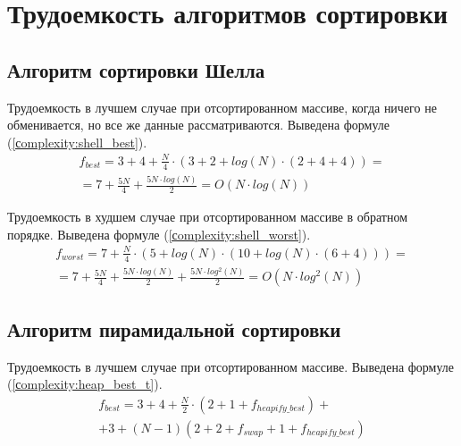 \section{Трудоемкость алгоритмов сортировки}

\subsection{Алгоритм сортировки Шелла}

Трудоемкость в лучшем случае при отсортированном массиве, когда ничего не обменивается, но все же данные рассматриваются. Выведена \newline формуле (\ref{сomplexity:shell_best}).
\begin{equation}
	\label{сomplexity:shell_best}
	\begin{gathered}
		f_{best} = 3 + 4 + \frac{N}{4} \cdot (3 + 2 + log(N) \cdot (2 + 4 + 4)) = \\
		= 7 + \frac{5N}{4} + \frac{5N \cdot log(N)}{2} = O(N \cdot log(N))
	\end{gathered}
\end{equation}

Трудоемкость в худшем случае при отсортированном массиве в обратном порядке. Выведена формуле (\ref{сomplexity:shell_worst}).
\begin{equation}
	\label{сomplexity:shell_worst}
	\begin{gathered}
		f_{worst} = 7 + \frac{N}{4} \cdot (5 + log(N) \cdot (10 + log(N) \cdot (6 + 4))) =\\
		= 7 + \frac{5N}{4} + \frac{5N \cdot log(N)}{2} + \frac{5N \cdot log^2(N)}{2} = O(N \cdot log^2(N))
	\end{gathered}
\end{equation}

\clearpage

\subsection{Алгоритм пирамидальной сортировки}

Трудоемкость в лучшем случае при отсортированном массиве. Выведена формуле (\ref{сomplexity:heap_best_t}).
\begin{equation}
	\label{сomplexity:heap_best_t}
	\begin{gathered}
		f_{best} = 3 + 4 + \frac{N}{2} \cdot (2 + 1 + f_{heapify\_best}) + \\
		+ 3 + (N - 1)(2 + 2 + f_{swap} + 1 + f_{heapify\_best})
	\end{gathered}
\end{equation}

